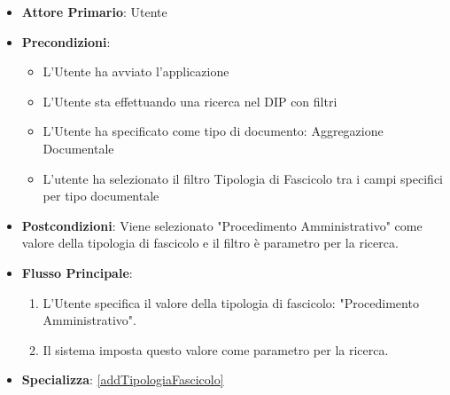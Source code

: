 \begin{itemize}
      \item \textbf{Attore Primario}: Utente
      \item \textbf{Precondizioni}: 
      \begin{itemize}            
            \item L'Utente ha avviato l'applicazione
            \item L'Utente sta effettuando una ricerca nel DIP con filtri
            \item L'Utente ha specificato come tipo di documento: Aggregazione Documentale
            \item L'utente ha selezionato il filtro Tipologia di Fascicolo tra i campi specifici per tipo documentale
      \end{itemize}
      \item \textbf{Postcondizioni}: Viene selezionato "Procedimento Amministrativo" come valore della tipologia di fascicolo e il filtro è parametro per la ricerca.
      \item \textbf{Flusso Principale}:
            \begin{enumerate}
                  \item L'Utente specifica il valore della tipologia di fascicolo: "Procedimento Amministrativo".
                  \item Il sistema imposta questo valore come parametro per la ricerca.
            \end{enumerate}
      \item \textbf{Specializza}: \ref{addTipologiaFascicolo}
\end{itemize}

